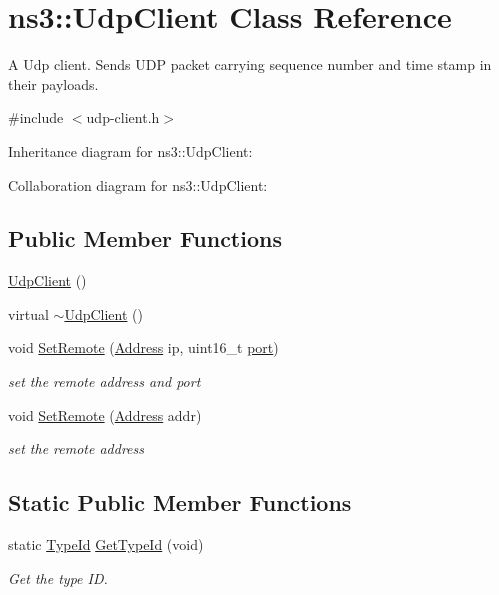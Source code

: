 \hypertarget{classns3_1_1UdpClient}{}\section{ns3\+:\+:Udp\+Client Class Reference}
\label{classns3_1_1UdpClient}


A Udp client. Sends U\+DP packet carrying sequence number and time stamp in their payloads.  




{\ttfamily \#include $<$udp-\/client.\+h$>$}



Inheritance diagram for ns3\+:\+:Udp\+Client\+:


Collaboration diagram for ns3\+:\+:Udp\+Client\+:
\subsection*{Public Member Functions}
\begin{DoxyCompactItemize}
\item 
\hyperlink{classns3_1_1UdpClient_aa2cc06671e4e3928a489f02ddf9f1408}{Udp\+Client} ()
\item 
virtual \hyperlink{classns3_1_1UdpClient_ad62ce55a62e89defa2dc67bdecb052c9}{$\sim$\+Udp\+Client} ()
\item 
void \hyperlink{classns3_1_1UdpClient_aa52fe4c544de9cafe529c2e15fd567e7}{Set\+Remote} (\hyperlink{classns3_1_1Address}{Address} ip, uint16\+\_\+t \hyperlink{visualizer-ideas_8txt_a21ff1c530daf8435e00048b7fc2c58e3}{port})
\begin{DoxyCompactList}\small\item\em set the remote address and port \end{DoxyCompactList}\item 
void \hyperlink{classns3_1_1UdpClient_a0a9f35e331cd7ff8301ef536f8008c69}{Set\+Remote} (\hyperlink{classns3_1_1Address}{Address} addr)
\begin{DoxyCompactList}\small\item\em set the remote address \end{DoxyCompactList}\end{DoxyCompactItemize}
\subsection*{Static Public Member Functions}
\begin{DoxyCompactItemize}
\item 
static \hyperlink{classns3_1_1TypeId}{Type\+Id} \hyperlink{classns3_1_1UdpClient_adfc2de1bb83a6543cbaa60cc85a01049}{Get\+Type\+Id} (void)
\begin{DoxyCompactList}\small\item\em Get the type ID. \end{DoxyCompactList}\end{DoxyCompactItemize}
